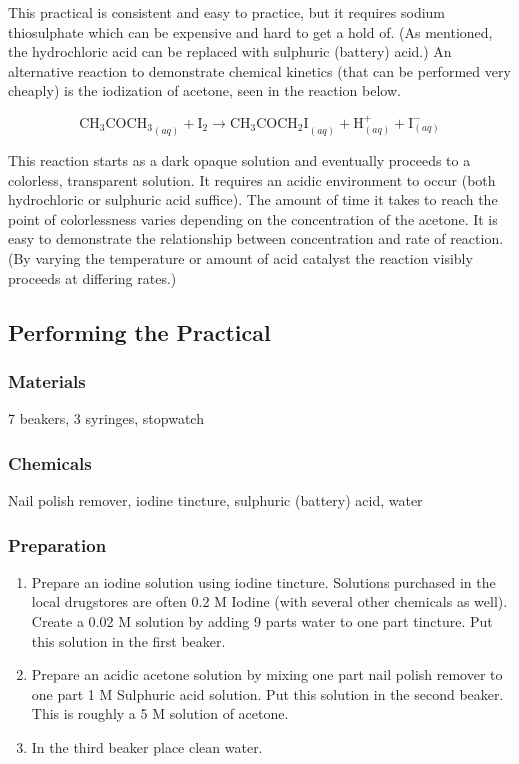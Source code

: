 This practical is consistent and easy to practice, but it requires sodium thiosulphate which can be expensive and hard to get a hold of. (As mentioned, the hydrochloric acid can be replaced with sulphuric (battery) acid.) An alternative reaction to demonstrate chemical kinetics (that can be performed very cheaply) is the iodization of acetone, seen in the reaction below.

\[ \mathrm{CH_3COCH_3}_{(aq)} + \mathrm{I_2} \longrightarrow \mathrm{CH_3COCH_2I}_{(aq)} + \mathrm{H}^{+}_{(aq)} + \mathrm{I}^{-}_{(aq)} \]

This reaction starts as a dark opaque solution and eventually proceeds to a colorless, transparent solution. It requires an acidic environment to occur (both hydrochloric or sulphuric acid suffice). The amount of time it takes to reach the point of colorlessness varies depending on the concentration of the acetone. It is easy to demonstrate the relationship between concentration and rate of reaction. (By varying the temperature or amount of acid catalyst the reaction visibly proceeds at differing rates.)

\subsection{Performing the Practical}

\subsubsection{Materials}
7 beakers, 3 syringes, stopwatch

\subsubsection{Chemicals}
Nail polish remover, iodine tincture, sulphuric (battery) acid, water

\subsubsection{Preparation}
\begin{enumerate}
\item Prepare an iodine solution using iodine tincture. Solutions purchased in the local drugstores are often 0.2 M Iodine (with several other chemicals as well). Create a 0.02 M solution by adding 9 parts water to one part tincture. Put this solution in the first beaker.
\item Prepare an acidic acetone solution by mixing one part nail polish remover to one part 1 M Sulphuric acid solution. Put this solution in the second beaker. This is roughly a 5 M solution of acetone.
\item In the third beaker place clean water.
\end{enumerate}

